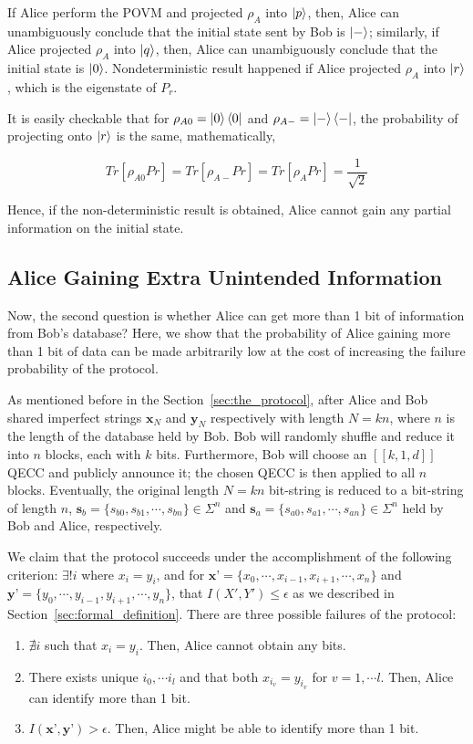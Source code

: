 \documentclass[%
 reprint,
superscriptaddress,
 amsmath,amssymb,
 aps,
]{revtex4-2}
\begin{document}
If Alice perform the POVM and projected $\rho_A$ into $\ket{p}$, then, Alice can unambiguously conclude that the initial state sent by Bob is $\ket{-}$; similarly, if Alice projected $\rho_A$ into $\ket{q}$, then, Alice can unambiguously conclude that the initial state is $\ket{0}$. Nondeterministic result happened if Alice projected $\rho_A$ into $\ket{r}$, which is the eigenstate of $P_r$.

It is easily checkable that for $\rho_{A0}=\ket{0}\bra{0}$ and $\rho_{A-}=\ket{-}\bra{-}$, the probability of projecting onto $\ket{r}$ is the same, mathematically,

\begin{equation}
    Tr[\rho_{A0}Pr]=Tr[\rho_{A-}Pr]=Tr[\rho_{A}Pr]=\frac{1}{\sqrt{2}}
\end{equation}

Hence, if the non-deterministic result is obtained, Alice cannot gain any partial information on the initial state.


\subsection{Alice Gaining Extra Unintended Information}
Now, the second question is whether Alice can get more than 1 bit of information from Bob's database? Here, we show that the probability of Alice gaining more than 1 bit of data can be made arbitrarily low at the cost of increasing the failure probability of the protocol.

As mentioned before in the Section~\ref{sec:the_protocol}, after Alice and Bob shared imperfect strings $\textbf{x}_N$ and $\textbf{y}_N$ respectively with length $N=kn$, where $n$ is the length of the database held by Bob. Bob will randomly shuffle and reduce it into $n$ blocks, each with $k$ bits. Furthermore, Bob will choose an $[[k, 1, d]]$ QECC and publicly announce it; the chosen QECC is then applied to all $n$ blocks. Eventually, the original length $N=kn$ bit-string is reduced to a bit-string of length $n$, $\textbf{s}_b=\{s_{b0}, s_{b1}, \cdots, s_{bn}\}\in\Sigma^n$ and $\textbf{s}_a=\{s_{a0}, s_{a1}, \cdots, s_{an}\}\in\Sigma^n$ held by Bob and Alice, respectively. 

We claim that the protocol succeeds under the accomplishment of the following criterion: $\exists! i$ where $x_i=y_i$, and for $\textbf{x'}=\{x_0, \cdots, x_{i-1}, x_{i+1}, \cdots, x_n\}$ and $\textbf{y'}=\{y_0, \cdots, y_{i-1}, y_{i+1}, \cdots, y_n\}$, that $I(X', Y')\le \epsilon$ as we described in Section~\ref{sec:formal_definition}. There are three possible failures of the protocol:
\begin{enumerate}
    \item $\nexists i$ such that $x_i=y_i$. Then, Alice cannot obtain any bits.

    \item There exists unique $i_0, \cdots i_l$ and that both $x_{i_v}=y_{i_v}$ for $v=1, \cdots l$. Then, Alice can identify more than 1 bit.

    \item $I(\textbf{x'}, \textbf{y'})>\epsilon$. Then, Alice might be able to identify more than 1 bit.
\end{enumerate}
\end{document}
